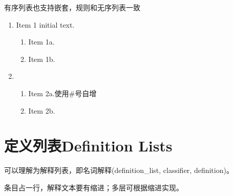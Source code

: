 \documentclass[a4paper,10pt,english]{sphinxmanual}
\begin{document}
\sphinxAtStartPar
有序列表也支持嵌套，规则和无序列表一致

\begin{sphinxVerbatim}[commandchars=\\\{\}]
    

     
     

     
\end{sphinxVerbatim}

\sphinxAtStartPar
{}
\begin{enumerate}
%
\item {} 
\sphinxAtStartPar
Item 1 initial text.
\begin{enumerate}
%
\item {} 
\sphinxAtStartPar
Item 1a.

\item {} 
\sphinxAtStartPar
Item 1b.

\end{enumerate}

\item {} \begin{enumerate}
%
\item {} 
\sphinxAtStartPar
Item 2a.使用\#号自增

\item {} 
\sphinxAtStartPar
Item 2b.

\end{enumerate}

\end{enumerate}


\section{定义列表Definition Lists}
\label{\detokenize{reStructureText_syntax:definition-lists}}
\sphinxAtStartPar
{} 可以理解为解释列表，即名词解释(definition\_list, classifier, definition)。

\sphinxAtStartPar
条目占一行，解释文本要有缩进；多层可根据缩进实现。
\end{document}
